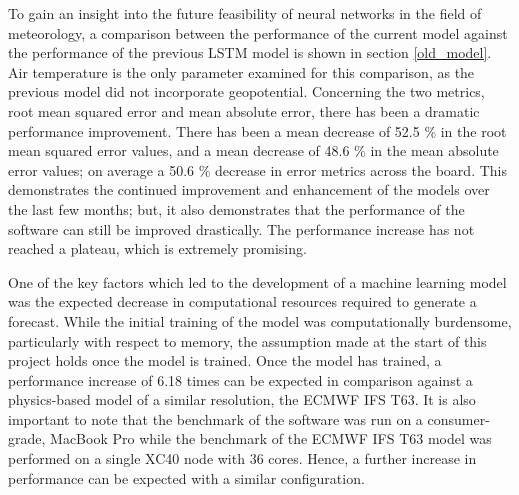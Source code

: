 To gain an insight into the future feasibility of neural networks in the field of meteorology, a comparison between the performance of the current model against the performance of the previous LSTM model is shown in section \ref{old_model}. Air temperature is the only parameter examined for this comparison, as the previous model did not incorporate geopotential. Concerning the two metrics, root mean squared error and mean absolute error, there has been a dramatic performance improvement. There has been a mean decrease of 52.5 \% in the root mean squared error values, and a mean decrease of 48.6 \% in the mean absolute error values; on average a 50.6 \% decrease in error metrics across the board. This demonstrates the continued improvement and enhancement of the models over the last few months; but, it also demonstrates that the performance of the software can still be improved drastically. The performance increase has not reached a plateau, which is extremely promising.

One of the key factors which led to the development of a machine learning model was the expected decrease in computational resources required to generate a forecast. While the initial training of the model was computationally burdensome, particularly with respect to memory, the assumption made at the start of this project holds once the model is trained. Once the model has trained, a performance increase of 6.18 times can be expected in comparison against a physics-based model of a similar resolution, the ECMWF IFS T63. It is also important to note that the benchmark of the software was run on a consumer-grade, MacBook Pro while the benchmark of the ECMWF IFS T63 model was performed on a single XC40 node with 36 cores. Hence, a further increase in performance can be expected with a similar configuration.

